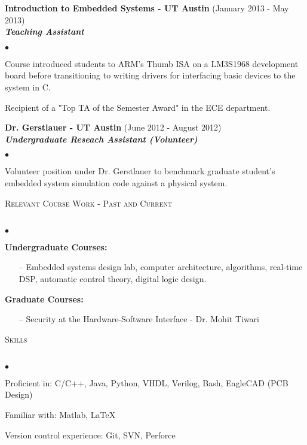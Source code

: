 \documentclass[11pt]{article}
\newcommand{\lineunder}{\vspace*{-8pt} \\ \hspace*{-18pt} \hrulefill \\}
\newcommand{\header}[1]{{\hspace*{-10pt}\vspace*{6pt} \textsc{#1}} \vspace*{-6pt} \lineunder}
\newcommand{\employer}[3]{{ \textbf{#1} (#2)\\ \textbf{\emph{#3}}}\\  }
\newenvironment{achievements}{\begin{list}{$\bullet$}{\topsep 0pt \itemsep -2pt}}{\vspace*{4pt}\end{list}}
\begin{document}
\employer{Introduction to Embedded Systems - UT Austin}{January 2013 - May 2013} {Teaching Assistant}
	\begin{achievements}
	\item Course introduced students to ARM’s Thumb ISA on a LM3S1968 development board before transitioning to writing drivers for interfacing basic devices to the system in C.
	\item Recipient of a "Top TA of the Semester Award" in the ECE department.
	\end{achievements}

\employer{Dr. Gerstlauer - UT Austin}{June 2012 - August 2012}{Undergraduate Reseach Assistant (Volunteer)}
	\begin{achievements}
	\item Volunteer position under Dr. Gerstlauer to benchmark graduate student’s embedded system simulation code against a physical system.
	\end{achievements}

\header{Relevant Course Work - Past and Current}
	\begin{achievements}
    \item \textbf{Undergraduate Courses:}
    	\begin{enumerate}
        	\item[--] Embedded systems design lab, computer architecture,  algorithms, real-time DSP, automatic control theory, digital logic design.
        \end{enumerate}
        
    \item \textbf{Graduate Courses:} 
        \begin{enumerate}
        	\item[--] Security at the Hardware-Software Interface - Dr. Mohit Tiwari
        \end{enumerate}
    \end{achievements}

\header{Skills}
\begin{achievements}
	\item Proficient in: C/C++, Java, Python, VHDL, Verilog, Bash, EagleCAD (PCB Design)
    \item Familiar with: Matlab, \LaTeX
    \item Version control experience: Git, SVN, Perforce
\end{achievements}
\end{document}

